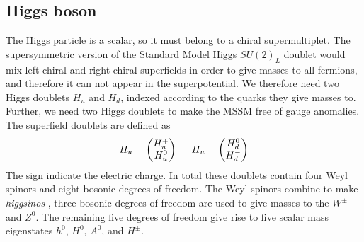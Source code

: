 \subsection{Higgs boson}
The Higgs particle is a scalar, so it must belong to a chiral supermultiplet. The supersymmetric version of the Standard Model Higgs $SU(2)_{L}$ doublet would mix left chiral and right chiral superfields in order to give masses to all fermions, and therefore it can not appear in the superpotential. We therefore need two Higgs doublets $H_{u}$ and $H_{d}$, indexed according to the quarks they give masses to. Further, we need two Higgs doublets to make the MSSM free of gauge anomalies. The superfield doublets are defined as
\begin{align}
    H_{u}=\begin{pmatrix}
            H_{u}^{+}\\
            H_{u}^{0}
\end{pmatrix}\hspace{5mm}H_{u}=\begin{pmatrix}
            H_{d}^{0}\\
            H_{d}^{-}
\end{pmatrix}
\end{align}
The sign indicate the electric charge. In total these doublets contain four Weyl spinors and eight bosonic degrees of freedom. The Weyl spinors combine to make \emph{higgsinos} , three bosonic degrees of freedom are used to give masses to the $W^{\pm}$ and $Z^{0}$. The remaining five degrees of freedom give rise to five scalar mass eigenstates $h^{0}$, $H^{0}$, $A^{0}$, and $H^{\pm}$.

